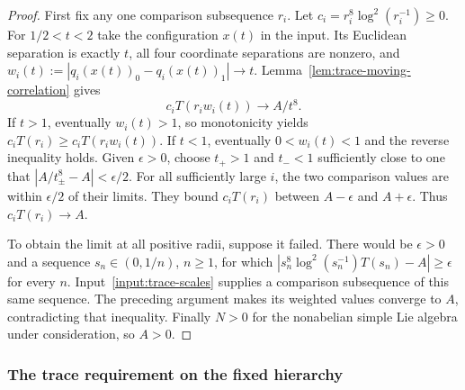 \begin{proof}
First fix any one comparison subsequence $r_i$. Let
$c_i=r_i^8\log^2(r_i^{-1})\geq0$. For $1/2<t<2$ take the configuration
$x(t)$ in the input. Its Euclidean separation is exactly $t$, all four
coordinate separations are nonzero, and
$w_i(t):=|q_i(x(t))_0-q_i(x(t))_1|\to t$.
Lemma~\ref{lem:trace-moving-correlation} gives
\[
 c_iT(r_iw_i(t))\longrightarrow A/t^8.
\]
If $t>1$, eventually $w_i(t)>1$, so monotonicity yields
$c_iT(r_i)\geq c_iT(r_iw_i(t))$. If $t<1$, eventually
$0<w_i(t)<1$ and the reverse inequality holds. Given $\epsilon>0$,
choose $t_+>1$ and $t_-<1$ sufficiently close to one that
$|A/t_\pm^8-A|<\epsilon/2$. For all sufficiently large $i$, the two
comparison values are within $\epsilon/2$ of their limits. They bound
$c_iT(r_i)$ between $A-\epsilon$ and $A+\epsilon$. Thus
$c_iT(r_i)\to A$.

To obtain the limit at all positive radii, suppose it failed. There would
be $\epsilon>0$ and a sequence $s_n\in(0,1/n)$, $n\geq1$, for which
$|s_n^8\log^2(s_n^{-1})T(s_n)-A|\geq\epsilon$ for every $n$.
Input~\ref{input:trace-scales} supplies a comparison subsequence of this
same sequence. The preceding argument makes its weighted values converge
to $A$, contradicting that inequality. Finally $N>0$ for the nonabelian
simple Lie algebra under consideration, so $A>0$.
\end{proof}
\subsubsection{The trace requirement on the fixed hierarchy}


